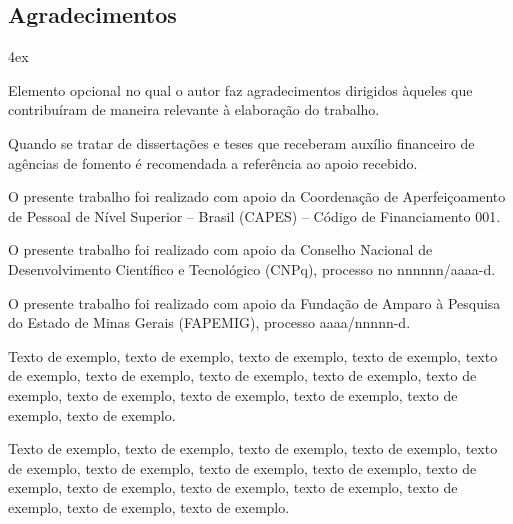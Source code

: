 \clearpage
\begin{center}
\chapter*{Agradecimentos}
\end{center}
\vspace*{1cm}
\begin{trivlist}  \itemsep 4ex  \normalsize
%
\item Elemento opcional no qual o autor faz agradecimentos dirigidos àqueles que contribuíram de maneira relevante à elaboração do trabalho.

\item Quando se tratar de dissertações e teses que receberam auxílio financeiro de agências de fomento é recomendada a referência ao apoio recebido.
 
\item O presente trabalho foi realizado com apoio da Coordenação de Aperfeiçoamento de Pessoal de Nível Superior – Brasil (CAPES) – Código de Financiamento 001.

\item O presente trabalho foi realizado com apoio da Conselho Nacional de Desenvolvimento Científico e Tecnológico (CNPq), processo no nnnnnn/aaaa-d.

\item O presente trabalho foi realizado com apoio da Fundação de Amparo à Pesquisa do Estado de Minas Gerais (FAPEMIG), processo aaaa/nnnnn-d.

\item Texto de exemplo, texto de exemplo, texto de exemplo, texto de exemplo, texto de exemplo, texto de exemplo, texto de exemplo, texto de exemplo, texto de exemplo, texto de exemplo, texto de exemplo, texto de exemplo, texto de exemplo, texto de exemplo.

\item Texto de exemplo, texto de exemplo, texto de exemplo, texto de exemplo, texto de exemplo, texto de exemplo, texto de exemplo, texto de exemplo, texto de exemplo, texto de exemplo, texto de exemplo, texto de exemplo, texto de exemplo, texto de exemplo, texto de exemplo.

\end{trivlist}